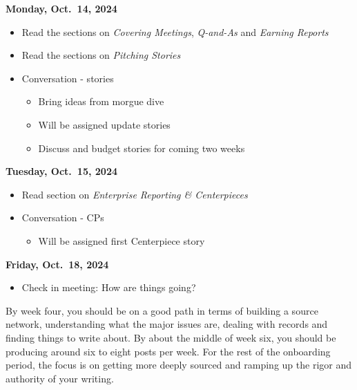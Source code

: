 \documentclass[
  11pt,
  american,
  letterpaperpaper,
  extrafontsizes,onecolumn,openright
  ]{memoir}
\providecommand{\tightlist}{%
  \setlength{\itemsep}{0pt}\setlength{\parskip}{0pt}}
\begin{document}
\textbf{Monday, Oct.~14, 2024}

\begin{itemize}
\tightlist
\item
  Read the sections on \emph{Covering Meetings}, \emph{Q-and-As} and \emph{Earning Reports}
\item
  Read the sections on \emph{Pitching Stories}\\
\item
  Conversation - stories

  \begin{itemize}
  \tightlist
  \item
    Bring ideas from morgue dive
  \item
    Will be assigned update stories
  \item
    Discuss and budget stories for coming two weeks
  \end{itemize}
\end{itemize}

\textbf{Tuesday, Oct.~15, 2024}

\begin{itemize}
\tightlist
\item
  Read section on \emph{Enterprise Reporting \& Centerpieces}
\item
  Conversation - CPs

  \begin{itemize}
  \tightlist
  \item
    Will be assigned first Centerpiece story
  \end{itemize}
\end{itemize}

\textbf{Friday, Oct.~18, 2024}

\begin{itemize}
\tightlist
\item
  Check in meeting: How are things going?
\end{itemize}

\leavevmode{}%
\begin{greybox}[frametitle=Onboarding Path - Week 4 and Beyond]
By week four, you should be on a good path in terms of building a source network, understanding what the major issues are, dealing with records and finding things to write about. By about the middle of week six, you should be producing around six to eight posts per week. For the rest of the onboarding period, the focus is on getting more deeply sourced and ramping up the rigor and authority of your writing.

\end{greybox}
\end{document}
